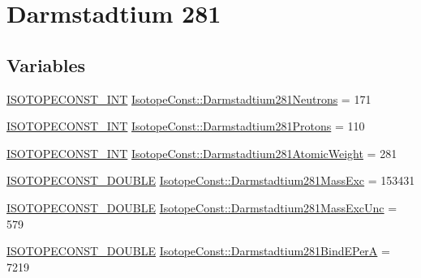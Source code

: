 \hypertarget{group___isotope_const-_darmstadtium-_ds281}{}\section{Darmstadtium 281}
\label{group___isotope_const-_darmstadtium-_ds281}
\subsection*{Variables}
\begin{DoxyCompactItemize}
\item 
\mbox{\hyperlink{group___isotope_const-_macros_ga5f18360b3e99483a35c32d789e62621c}{I\+S\+O\+T\+O\+P\+E\+C\+O\+N\+S\+T\+\_\+\+I\+NT}} \mbox{\hyperlink{group___isotope_const-_darmstadtium-_ds281_ga67aaf1f769e62092f8a1bbbff1c653de}{Isotope\+Const\+::\+Darmstadtium281\+Neutrons}} = 171
\item 
\mbox{\hyperlink{group___isotope_const-_macros_ga5f18360b3e99483a35c32d789e62621c}{I\+S\+O\+T\+O\+P\+E\+C\+O\+N\+S\+T\+\_\+\+I\+NT}} \mbox{\hyperlink{group___isotope_const-_darmstadtium-_ds281_gaaf8554cf4b5a0b5a900e07d38e98d391}{Isotope\+Const\+::\+Darmstadtium281\+Protons}} = 110
\item 
\mbox{\hyperlink{group___isotope_const-_macros_ga5f18360b3e99483a35c32d789e62621c}{I\+S\+O\+T\+O\+P\+E\+C\+O\+N\+S\+T\+\_\+\+I\+NT}} \mbox{\hyperlink{group___isotope_const-_darmstadtium-_ds281_ga7bf0ff8a23343e51403e9a6d84407091}{Isotope\+Const\+::\+Darmstadtium281\+Atomic\+Weight}} = 281
\item 
\mbox{\hyperlink{group___isotope_const-_macros_ga8f45a7272ce02c0b4c65c44636ed719a}{I\+S\+O\+T\+O\+P\+E\+C\+O\+N\+S\+T\+\_\+\+D\+O\+U\+B\+LE}} \mbox{\hyperlink{group___isotope_const-_darmstadtium-_ds281_ga17f04be43be0357e8ded9a8251492f00}{Isotope\+Const\+::\+Darmstadtium281\+Mass\+Exc}} = 153431
\item 
\mbox{\hyperlink{group___isotope_const-_macros_ga8f45a7272ce02c0b4c65c44636ed719a}{I\+S\+O\+T\+O\+P\+E\+C\+O\+N\+S\+T\+\_\+\+D\+O\+U\+B\+LE}} \mbox{\hyperlink{group___isotope_const-_darmstadtium-_ds281_ga97d803d1eacd3ee126b8f5332870b6f8}{Isotope\+Const\+::\+Darmstadtium281\+Mass\+Exc\+Unc}} = 579
\item 
\mbox{\hyperlink{group___isotope_const-_macros_ga8f45a7272ce02c0b4c65c44636ed719a}{I\+S\+O\+T\+O\+P\+E\+C\+O\+N\+S\+T\+\_\+\+D\+O\+U\+B\+LE}} \mbox{\hyperlink{group___isotope_const-_darmstadtium-_ds281_ga57c8f7b93fb9655d45f5fedbf23d37fb}{Isotope\+Const\+::\+Darmstadtium281\+Bind\+E\+PerA}} = 7219

\end{DoxyCompactItemize}

